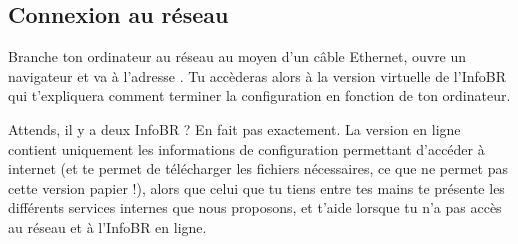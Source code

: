 
\subsection{Connexion au réseau}

Branche ton ordinateur au réseau au moyen d'un câble Ethernet, ouvre un navigateur et va à l'adresse . Tu accèderas alors à la version virtuelle de l'InfoBR qui t'expliquera comment terminer la configuration en fonction de ton ordinateur.


Attends, il y a deux InfoBR ? En fait pas exactement. La version en ligne contient uniquement les informations de configuration permettant d'accéder à internet (et te permet de télécharger les fichiers nécessaires, ce que ne permet pas cette version papier !), alors que celui que tu tiens entre tes mains te présente les différents services internes que nous proposons, et t'aide lorsque tu n'a pas accès au réseau et à l'InfoBR en ligne.
